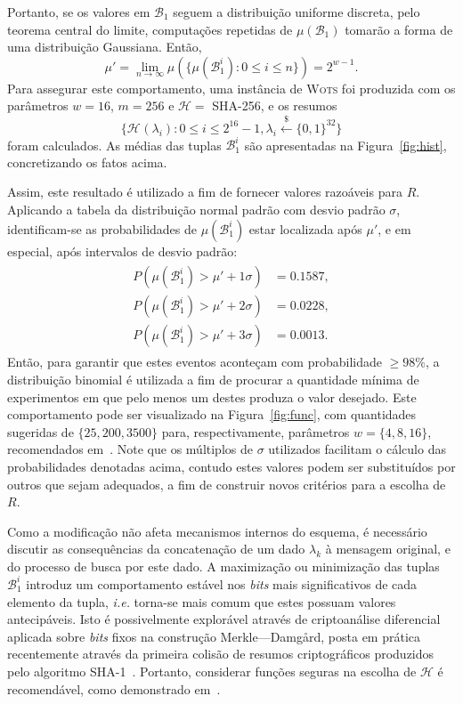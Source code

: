 \documentclass{ufsctex/ufsctex}
\newcommand{\hh}{\mathcal{H}}
\newcommand{\bone}{\mathcal{B}_{1}}
\newcommand{\hash}[2][]{\mathcal{H}^{#1} (#2)}
\newcommand{\binwds}[1]{\{0, 1\}^{#1}}
\newcommand{\random}{\stackrel{\$}{\longleftarrow}}
\newcommand{\wots}{\textsc{Wots}}
\begin{document}
Portanto, se os valores em $\bone{}$ seguem a distribuição uniforme discreta,
pelo teorema central do limite, computações repetidas de $\mu(\bone{})$ tomarão
a forma de uma distribuição Gaussiana. Então,
\begin{equation}
  \mu' = \lim_{n \to \infty}
    \mu(\{\mu(\bone^{i}) : 0 \leq i \leq n\}) = 2^{w - 1}.
\end{equation}
Para assegurar este comportamento, uma instância de \wots{} foi produzida com
os parâmetros $w = 16$, $m = 256$ e $\hh{} =$ SHA-256, e os resumos
\begin{equation}
  \{\hash{\lambda_{i}} : 0 \leq i \leq 2^{16} - 1, \lambda_{i}
    \random{} \binwds{32}\}
\end{equation}
foram calculados. As médias das tuplas $\bone^{i}$ são apresentadas na
Figura~\ref{fig:hist}, concretizando os fatos acima.

Assim, este resultado é utilizado a fim de fornecer valores razoáveis para $R$.
Aplicando a tabela da distribuição normal padrão com desvio padrão $\sigma$,
identificam-se as probabilidades de $\mu(\bone^{i})$ estar localizada após
$\mu'$, e em especial, após intervalos de desvio padrão:
\begin{align}
  \begin{split}
    P(\mu(\bone^{i}) > \mu' + 1\sigma) &= 0.1587, \\
    P(\mu(\bone^{i}) > \mu' + 2\sigma) &= 0.0228, \\
    P(\mu(\bone^{i}) > \mu' + 3\sigma) &= 0.0013.
  \end{split}
\end{align}
Então, para garantir que estes eventos aconteçam com probabilidade $\geq 98\%$,
a distribuição binomial é utilizada a fim de procurar a quantidade mínima de
experimentos em que pelo menos um destes produza o valor desejado. Este
comportamento pode ser visualizado na Figura~\ref{fig:func}, com quantidades
sugeridas de $\{25, 200, 3500\}$ para, respectivamente, parâmetros $w = \{4, 8,
16\}$, recomendados em~\cite[Capítulo 6]{Huelsing:report:2018:may}. Note que
os múltiplos de $\sigma$ utilizados facilitam o cálculo das probabilidades
denotadas acima, contudo estes valores podem ser substituídos por outros
que sejam adequados, a fim de construir novos critérios para a escolha de $R$.

Como a modificação não afeta mecanismos internos do esquema, é necessário
discutir as consequências da concatenação de um dado $\lambda_{k}$ à mensagem
original, e do processo de busca por este dado. A maximização ou minimização
das tuplas $\bone^{i}$ introduz um comportamento estável nos \emph{bits} mais
significativos de cada elemento da tupla, \emph{i.e.} torna-se mais comum que
estes possuam valores antecipáveis. Isto é possivelmente explorável através de
criptoanálise diferencial aplicada sobre \emph{bits} fixos na construção
Merkle---Damgård, posta em prática recentemente através da primeira colisão de
resumos criptográficos produzidos pelo algoritmo
SHA-1~\cite{Stevens:inproc:2017:jul}. Portanto, considerar funções seguras na
escolha de $\hh{}$ é recomendável, como demonstrado em~\cite[Seção
3.2]{Huelsing:inproc:2013:jun}.
\end{document}
